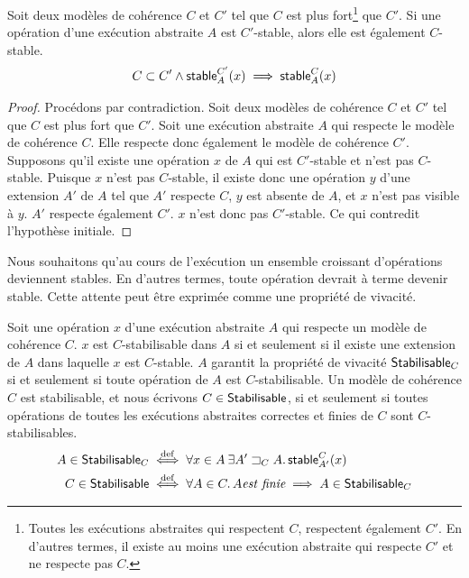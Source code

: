 
\begin{theorem}\label{th:stability-hierarchy}
Soit deux modèles de cohérence $C$ et $C'$ tel que $C$ est plus fort\footnote{Toutes les exécutions abstraites qui respectent $C$, respectent également $C'$. En d'autres termes, il existe au moins une exécution abstraite qui respecte $C'$ et ne respecte pas $C$.} que $C'$.
Si une opération d'une exécution abstraite $A$ est $C'$-stable, alors elle est également $C$-stable.
\begin{equation*}
    C \subset C' \land \operatorname{\mathsf{stable}}_A^{C'}(x) \implies \operatorname{\mathsf{stable}}_A^{C}(x)
\end{equation*}
\end{theorem}

\begin{proof}
Procédons par contradiction.
Soit deux modèles de cohérence $C$ et $C'$ tel que $C$ est plus fort que $C'$.
Soit une exécution abstraite $A$ qui respecte le modèle de cohérence $C$.
Elle respecte donc également le modèle de cohérence $C'$.
Supposons qu'il existe une opération $x$ de $A$ qui est $C'$-stable et n'est pas $C$-stable.
Puisque $x$ n'est pas $C$-stable, il existe donc une opération $y$ d'une extension $A'$ de $A$ tel que $A'$ respecte $C$, $y$ est absente de $A$, et $x$ n'est pas visible à $y$.
$A'$ respecte également $C'$.
$x$ n'est donc pas $C'$-stable.
Ce qui contredit l'hypothèse initiale.
\end{proof}

Nous souhaitons qu'au cours de l'exécution un ensemble croissant d'opérations deviennent stables.
En d'autres termes, toute opération devrait à terme devenir stable.
Cette attente peut être exprimée comme une propriété de vivacité.

\begin{definition}
Soit une opération $x$ d'une exécution abstraite $A$ qui respecte un modèle de cohérence $C$.
$x$ est $C$-stabilisable dans $A$ si et seulement si il existe une extension de $A$ dans laquelle $x$ est $C$-stable.
$A$ garantit la propriété de vivacité $\operatorname{\mathsf{Stabilisable}}_C$ si et seulement si toute opération de $A$ est $C$-stabilisable.
Un modèle de cohérence $C$ est stabilisable, et nous écrivons $C \in \operatorname{\mathsf{Stabilisable}}$, si et seulement si toutes opérations de toutes les exécutions abstraites correctes et finies de $C$ sont $C$-stabilisables.
\begin{align*}
    A \in \operatorname{\mathsf{Stabilisable}}_C &\overset{\mathrm{def}}{\iff} \forall x \in A \:\exists A' \sqsupset_C A \ldotp \operatorname{\mathsf{stable}}_{A'}^C(x)\\
    C \in \operatorname{\mathsf{Stabilisable}} &\overset{\mathrm{def}}{\iff} \forall A \in C \ldotp A \textit{est finie} \implies A \in \operatorname{\mathsf{Stabilisable}}_C
\end{align*}
\end{definition}

